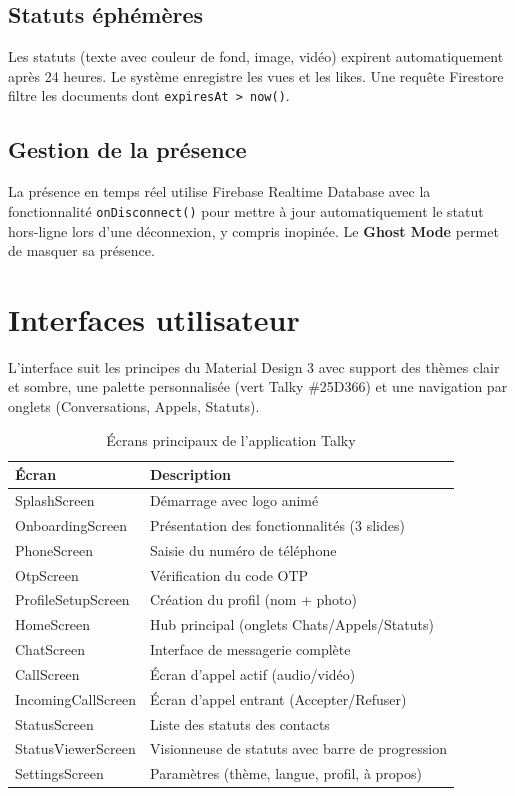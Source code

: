 \documentclass[12pt,a4paper]{report}
\begin{document}
\subsection{Statuts éphémères}

Les statuts (texte avec couleur de fond, image, vidéo) expirent automatiquement après 24 heures. Le système enregistre les vues et les likes. Une requête Firestore filtre les documents dont \texttt{expiresAt > now()}.

\subsection{Gestion de la présence}

La présence en temps réel utilise Firebase Realtime Database avec la fonctionnalité \texttt{onDisconnect()} pour mettre à jour automatiquement le statut hors-ligne lors d'une déconnexion, y compris inopinée. Le \textbf{Ghost Mode} permet de masquer sa présence.

\section{Interfaces utilisateur}

L'interface suit les principes du Material Design 3 avec support des thèmes clair et sombre, une palette personnalisée (vert Talky \#25D366) et une navigation par onglets (Conversations, Appels, Statuts).

\begin{table}[H]
\centering
\caption{Écrans principaux de l'application Talky}
\label{tab:screens}
\renewcommand{\arraystretch}{1.3}
\begin{tabularx}{\textwidth}{@{}lX@{}}
\toprule
\textbf{Écran} & \textbf{Description}\\\midrule
SplashScreen         & Démarrage avec logo animé\\
OnboardingScreen     & Présentation des fonctionnalités (3 slides)\\
PhoneScreen          & Saisie du numéro de téléphone\\
OtpScreen            & Vérification du code OTP\\
ProfileSetupScreen   & Création du profil (nom + photo)\\
HomeScreen           & Hub principal (onglets Chats/Appels/Statuts)\\
ChatScreen           & Interface de messagerie complète\\
CallScreen           & Écran d'appel actif (audio/vidéo)\\
IncomingCallScreen   & Écran d'appel entrant (Accepter/Refuser)\\
StatusScreen         & Liste des statuts des contacts\\
StatusViewerScreen   & Visionneuse de statuts avec barre de progression\\
SettingsScreen       & Paramètres (thème, langue, profil, à propos)\\
\bottomrule
\end{tabularx}
\end{table}
\end{document}
